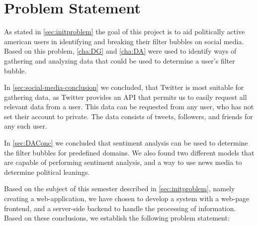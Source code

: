 \chapter{Problem Statement}\label{ch:problem}

As stated in \autoref{sec:initproblem} the goal of this project is
to aid politically active american users in identifying and breaking their
filter bubbles on social media. Based on this problem, \autoref{cha:DG} and
\autoref{cha:DA} were used to identify ways of gathering and analyzing data that
could be used to determine a user's filter bubble.

In \autoref{sec:social-media-conclusion} we concluded, that Twitter is most
suitable for gathering data, as Twitter provides an \ac{API} that permits us
to easily request all relevant data from a user. This data can be requested from
any user, who has not set their account to private. The data consists of tweets,
followers, and friends for any such user.

In \autoref{sec:DAConc} we concluded that sentiment analysis can be used to
determine the filter bubbles for predefined domains. We also found two different
models that are capable of performing sentiment analysis, and a way to use news
media to determine political leanings.

Based on the subject of this semester described in \autoref{sec:initproblem},
namely creating a web-application, we have chosen to develop a system with a
web-page frontend, and a server-side backend to handle the processing of
information. Based on these conclusions, we establish the following problem
statement:\nl

\begin{center}
\begin{minipage}{0.95\linewidth}
\end{minipage}
\end{center}
\newpage


